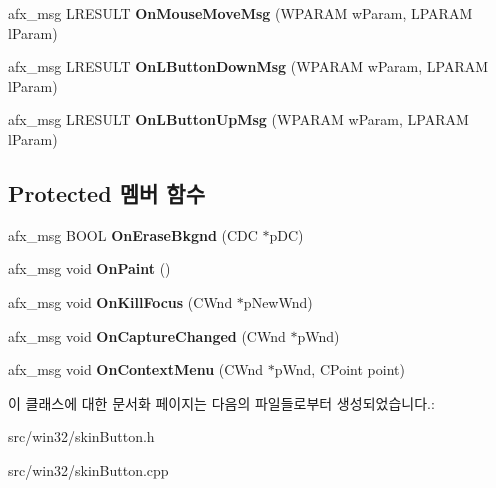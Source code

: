 \begin{DoxyCompactItemize}
afx\+\_\+msg L\+R\+E\+S\+U\+LT {\bfseries On\+Mouse\+Move\+Msg} (W\+P\+A\+R\+AM w\+Param, L\+P\+A\+R\+AM l\+Param)
\item 
\mbox{\label{class_skin_button_a824c7ad6169c7373af133b1df439a405}} 
afx\+\_\+msg L\+R\+E\+S\+U\+LT {\bfseries On\+L\+Button\+Down\+Msg} (W\+P\+A\+R\+AM w\+Param, L\+P\+A\+R\+AM l\+Param)
\item 
\mbox{\label{class_skin_button_a698952f37a3b9b3dbc3341260c7737bc}} 
afx\+\_\+msg L\+R\+E\+S\+U\+LT {\bfseries On\+L\+Button\+Up\+Msg} (W\+P\+A\+R\+AM w\+Param, L\+P\+A\+R\+AM l\+Param)
\end{DoxyCompactItemize}
\subsection*{Protected 멤버 함수}
\begin{DoxyCompactItemize}
\item 
\mbox{\label{class_skin_button_ad046e6e663c72734fb1dc470d67f6ae0}} 
afx\+\_\+msg B\+O\+OL {\bfseries On\+Erase\+Bkgnd} (C\+DC $\ast$p\+DC)
\item 
\mbox{\label{class_skin_button_ac508eb8cb788a169c264f48e202aec37}} 
afx\+\_\+msg void {\bfseries On\+Paint} ()
\item 
\mbox{\label{class_skin_button_ab89eac5d77588b47adfcbb9f664568be}} 
afx\+\_\+msg void {\bfseries On\+Kill\+Focus} (C\+Wnd $\ast$p\+New\+Wnd)
\item 
\mbox{\label{class_skin_button_ad4f3d9812259e8f4a9df22a14ae06c6f}} 
afx\+\_\+msg void {\bfseries On\+Capture\+Changed} (C\+Wnd $\ast$p\+Wnd)
\item 
\mbox{\label{class_skin_button_a1d8e1d9486a36b42c1a1d2a26bde5efa}} 
afx\+\_\+msg void {\bfseries On\+Context\+Menu} (C\+Wnd $\ast$p\+Wnd, C\+Point point)
\end{DoxyCompactItemize}


이 클래스에 대한 문서화 페이지는 다음의 파일들로부터 생성되었습니다.\+:\begin{DoxyCompactItemize}
\item 
src/win32/skin\+Button.\+h\item 
src/win32/skin\+Button.\+cpp\end{DoxyCompactItemize}
